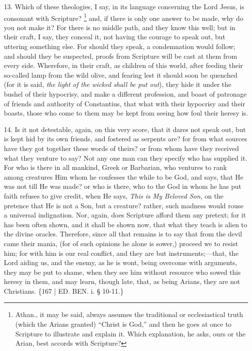 13. Which of these theologies,
I say, in its language concerning the Lord Jesus, is consonant with
Scripture? \footnote{Athan., it may be said, always assumes the traditional or
ecclesiastical truth (which the Arians granted) ``Christ is God,'' and
then he goes at once to Scripture to illustrate and explain it. Which
explanation, he asks, ours or the Arian, best accords with Scripture?} and, if
there is only one answer to be made, why do you not make it? For there
is no middle path, and they know this well; but in their craft, I say,
they conceal it, not having the courage to speak out, but uttering
something else. For should they speak, a condemnation would follow;
and should they be suspected, proofs from Scripture will be cast at
them from every side. Wherefore, in their craft, as children of this
world, after feeding their so-called lamp from the wild olive, and
fearing lest it should soon be quenched (for it is said, \emph{the
light of the wicked shall be put out}), they hide it under the
bushel of their hypocrisy, and make a different profession, and boast
of patronage of friends and authority of Constantius, that what with
their hypocrisy and their boasts, those who come to them may be kept
from seeing how foul their heresy is.

14. Is it not detestable,
again, on this very score, that it dares not speak out, but is kept
hid by its own friends, and fostered as serpents are? for from what
sources have they got together these words of theirs? or from whom
have they received what they venture to say? Not any one man can they
specify who has supplied it. For who is there in all mankind, Greek or
Barbarian, who ventures to rank among creatures Him whom he confesses
the while to be God, and says, that He was not till He was made? or
who is there, who to the God in whom he has put faith refuses to give
credit, when He says, \emph{This is My Beloved Son}, on the pretence
that He is not a Son, but a creature? rather, such madness would rouse
a universal indignation. Nor, again, does Scripture afford them any
pretext; for it has been often shown, and it shall be shown now, that
what they teach is alien to the divine oracles. Therefore, since all
that remains is to say that from the devil came their mania, (for of
such opinions he alone is sower,) proceed we to resist him; for with
him is our real conflict, and they are but instruments;—that, the
Lord aiding us, and the enemy, as he is wont, being overcome with
arguments, they may be put to shame, when they see him without
resource who sowed this heresy in them, and may learn, though late,
that, as being Arians, they are not Christians. \{167 | ED. BEN. i. § 10-11.\}

